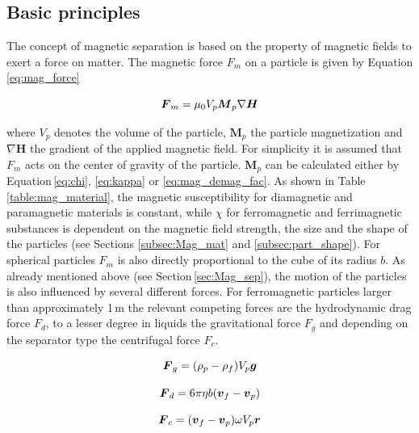 \subsection{Basic principles}
\label{subsec:bas_princ}
The concept of magnetic separation is based on the property of magnetic fields to exert a force on matter. The magnetic force $F_{m}$ on a particle is given by Equation \ref{eq:mag_force}

\begin{equation}
\label{eq:mag_force}
\centering
\boldsymbol{F}_{m} = \mu_{0}V_{p}\boldsymbol{M}_{p}\nabla\boldsymbol{H}
\end{equation}

where $V_{p}$ denotes the volume of the particle, $\boldsymbol{M}_{p}$ the particle magnetization and $\nabla\boldsymbol{H}$ the gradient of the applied magnetic field. For simplicity it is assumed that $F_{m}$ acts on the center of gravity of the particle. $\boldsymbol{M}_{p}$ can be calculated either by Equation\,\ref{eq:chi}, \ref{eq:kappa} or \ref{eq:mag_demag_fac}. As shown in Table\,\ref{table:mag_material}, the magnetic susceptibility for diamagnetic and paramagnetic materials is constant, while $\chi$ for ferromagnetic and ferrimagnetic substances is dependent on the magnetic field strength, the size and the shape of the particles (see Sections \ref{subsec:Mag_mat} and \ref{subsec:part_shape}). For spherical particles $F_{m}$ is also directly proportional to the cube of its radius $b$. \newline
As already mentioned above (see Section\,\ref{sec:Mag_sep}), the motion of the particles is also influenced by several different  forces. For ferromagnetic particles larger than approximately 1\,\textmu m the relevant competing forces are  the hydrodynamic drag force $F_{d}$, to a lesser degree in liquids the gravitational force $F_{g}$ and depending on the separator type the centrifugal force $F_{c}$.  


\begin{equation}
\label{eq:grav_force}
\centering
\boldsymbol{F}_{g} = (\rho_{p}-\rho_{f})V_{p}\boldsymbol{g}
\end{equation}

\begin{equation}
\label{eq:drag_force}
\centering
\boldsymbol{F}_{d} = 6\pi\eta b(\boldsymbol{v}_{f}-\boldsymbol{v}_{p})
\end{equation}

\begin{equation}
\label{eq:cent_force}
\centering
\boldsymbol{F}_{c} = (\boldsymbol{v}_{f}-\boldsymbol{v}_{p})\omega V_{p}\boldsymbol{r}
\end{equation}

